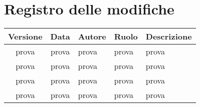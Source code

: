 \section*{Registro delle modifiche}
{
	\renewcommand{\arraystretch}{1}
	\centering
	\setlength{\aboverulesep}{0pt}
	\setlength{\belowrulesep}{0pt}
	\setlength{\extrarowheight}{0.75ex}
	\begin{longtable}{ c c C{3cm} C{3cm} C{4cm} }
		\textbf{Versione} & \textbf{Data} & \textbf{Autore} & \textbf{Ruolo} & \textbf{Descrizione}\\
		\toprule
		\endhead

		prova & prova & prova & prova & prova \\

		prova & prova & prova & prova & prova \\

		prova & prova & prova & prova & prova \\

		prova & prova & prova & prova & prova \\


		\bottomrule
	\end{longtable}
}